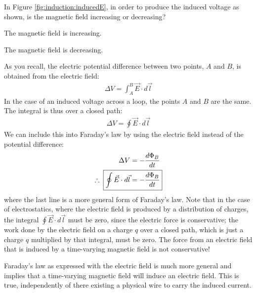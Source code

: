 \begin{checkpoint}{}
	\begin{MCquestion}{In Figure \ref{fig:induction:inducedE}, in order to produce the induced voltage as shown, is the magnetic field increasing or decreasing?}
		\item The magnetic field is increasing.
		\item The magnetic field is decreasing. \correct
	\end{MCquestion}
\end{checkpoint}
As you recall, the electric potential difference between two points, $A$ and $B$, is obtained from the electric field:
\begin{align*}
\Delta V = \int_A^B \vec E\cdot d\vec l
\end{align*}
In the case of an induced voltage across a loop, the points $A$ and $B$ are the same. The integral is thus over a closed path:
\begin{align*}
\Delta V = \oint \vec E\cdot d\vec l
\end{align*}
We can include this into Faraday's law by using the electric field instead of the potential difference:
\begin{align*}
\Delta V &=-\frac{d\Phi_B}{dt}\\
\therefore \;\;\Aboxed{\oint \vec E\cdot d\vec l &= -\frac{d\Phi_B}{dt}}
\end{align*}
where the last line is a more general form of Faraday's law. Note that in the case of electrostatics, where the electric field is produced by a distribution of charges, the integral $\oint \vec E\cdot d\vec l$ must be zero, since the electric force is conservative; the work done by the electric field on a charge $q$ over a closed path, which is just a charge $q$ multiplied by that integral, must be zero. The force from an electric field that is induced by a time-varying magnetic field is not conservative!

Faraday's law as expressed with the electric field is much more general and implies that a time-varying magnetic field will induce an electric field. This is true, independently of there existing a physical wire to carry the induced current. 

